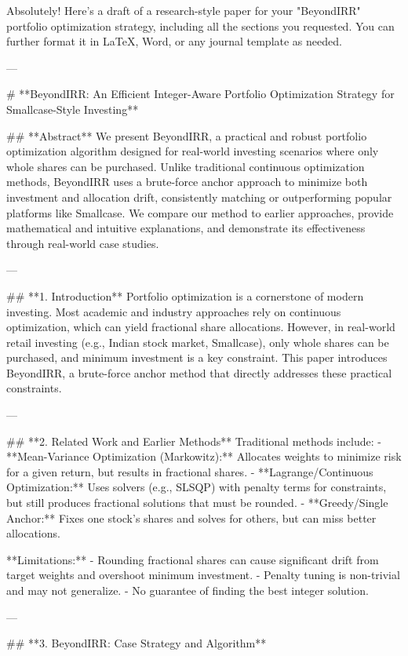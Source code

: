 Absolutely! Here's a draft of a research-style paper for your "BeyondIRR" portfolio optimization strategy, including all the sections you requested. You can further format it in LaTeX, Word, or any journal template as needed.

---

# **BeyondIRR: An Efficient Integer-Aware Portfolio Optimization Strategy for Smallcase-Style Investing**

## **Abstract**
We present BeyondIRR, a practical and robust portfolio optimization algorithm designed for real-world investing scenarios where only whole shares can be purchased. Unlike traditional continuous optimization methods, BeyondIRR uses a brute-force anchor approach to minimize both investment and allocation drift, consistently matching or outperforming popular platforms like Smallcase. We compare our method to earlier approaches, provide mathematical and intuitive explanations, and demonstrate its effectiveness through real-world case studies.

---

## **1. Introduction**
Portfolio optimization is a cornerstone of modern investing. Most academic and industry approaches rely on continuous optimization, which can yield fractional share allocations. However, in real-world retail investing (e.g., Indian stock market, Smallcase), only whole shares can be purchased, and minimum investment is a key constraint. This paper introduces BeyondIRR, a brute-force anchor method that directly addresses these practical constraints.

---

## **2. Related Work and Earlier Methods**
Traditional methods include:
- **Mean-Variance Optimization (Markowitz):** Allocates weights to minimize risk for a given return, but results in fractional shares.
- **Lagrange/Continuous Optimization:** Uses solvers (e.g., SLSQP) with penalty terms for constraints, but still produces fractional solutions that must be rounded.
- **Greedy/Single Anchor:** Fixes one stock's shares and solves for others, but can miss better allocations.

**Limitations:**
- Rounding fractional shares can cause significant drift from target weights and overshoot minimum investment.
- Penalty tuning is non-trivial and may not generalize.
- No guarantee of finding the best integer solution.

---

## **3. BeyondIRR: Case Strategy and Algorithm**

